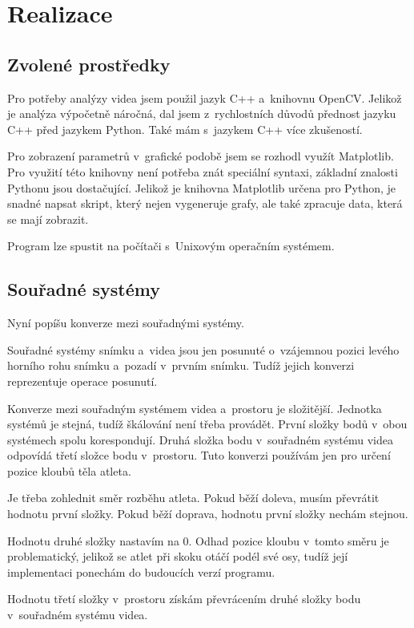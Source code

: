 \chapter{Realizace}

\section{Zvolené prostředky}
\label{sec:prostredky}

Pro potřeby analýzy videa jsem použil jazyk C++ a~knihovnu OpenCV. Jelikož je analýza výpočetně náročná, dal jsem z~rychlostních důvodů přednost jazyku C++ před jazykem Python. Také mám s~jazykem C++ více zkušeností.

Pro zobrazení parametrů v~grafické podobě jsem se rozhodl využít Matplotlib. Pro využití této knihovny není potřeba znát speciální syntaxi, základní znalosti Pythonu jsou dostačující. Jelikož je knihovna Matplotlib určena pro Python, je snadné napsat skript, který nejen vygeneruje grafy, ale také zpracuje data, která se mají zobrazit.

Program lze spustit na počítači s~Unixovým operačním systémem.




\section{Souřadné systémy}

Nyní popíšu konverze mezi souřadnými systémy.

Souřadné systémy snímku a~videa jsou jen posunuté o~vzájemnou pozici levého horního rohu snímku a~pozadí v~prvním snímku. Tudíž jejich konverzi reprezentuje operace posunutí.

Konverze mezi souřadným systémem videa a~prostoru je složitější. Jednotka systémů je stejná, tudíž škálování není třeba provádět. První složky bodů v~obou systémech spolu korespondují. Druhá složka bodu v~souřadném systému videa odpovídá třetí složce bodu v~prostoru. Tuto konverzi používám jen pro určení pozice kloubů těla atleta.

Je třeba zohlednit směr rozběhu atleta. Pokud běží doleva, musím převrátit hodnotu první složky. Pokud běží doprava, hodnotu první složky nechám stejnou.

Hodnotu druhé složky nastavím na $0$. Odhad pozice kloubu v~tomto směru je problematický, jelikož se atlet při skoku otáčí podél své osy, tudíž její implementaci ponechám do budoucích verzí programu.

Hodnotu třetí složky v~prostoru získám převrácením druhé složky bodu v~souřadném systému videa.

